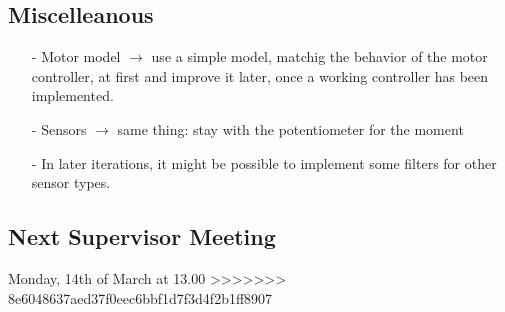 \subsection{Miscelleanous}
\begin{itemize}
  \item[-] Motor model $\rightarrow$ use a simple model, matchig the behavior of the motor controller, at first and improve it later, once a working controller has been implemented.
  \item[-] Sensors $\rightarrow$ same thing: stay with the potentiometer for the moment
  \item[-] In later iterations, it might be possible to implement some filters for other sensor types.
\end{itemize}

\subsection{Next Supervisor Meeting}
Monday, 14th of March at 13.00
>>>>>>> 8e6048637aed37f0eec6bbf1d7f3d4f2b1ff8907











